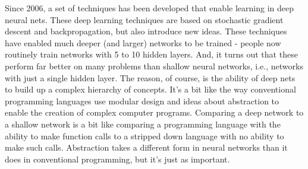 Since 2006, a set of techniques has been developed that enable learning in deep neural nets. These deep learning techniques are based on stochastic gradient descent and backpropagation, but also introduce new ideas. These techniques have enabled much deeper (and larger) networks to be trained - people now routinely train networks with 5 to 10 hidden layers. And, it turns out that these perform far better on many problems than shallow neural networks, i.e., networks with just a single hidden layer. The reason, of course, is the ability of deep nets to build up a complex hierarchy of concepts. It's a bit like the way conventional programming languages use modular design and ideas about abstraction to enable the creation of complex computer programs. Comparing a deep network to a shallow network is a bit like comparing a programming language with the ability to make function calls to a stripped down language with no ability to make such calls. Abstraction takes a different form in neural networks than it does in conventional programming, but it's just as important.

